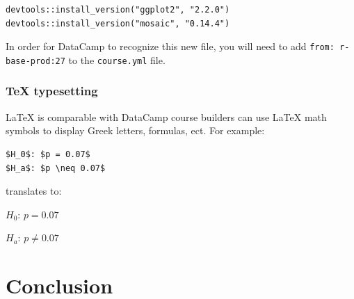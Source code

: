 \documentclass[12pt]{article}\usepackage[]{graphicx}\usepackage[]{color}
\begin{document}
\begin{verbatim}
devtools::install_version("ggplot2", "2.2.0")
devtools::install_version("mosaic", "0.14.4")
\end{verbatim}
In order for DataCamp to recognize this new file, you will need to add \texttt{from: r-base-prod:27} to the \texttt{course.yml} file.

\subsubsection{TeX typesetting}
LaTeX is comparable with DataCamp course builders can use LaTeX math symbols to display Greek letters, formulas, ect. For example:
\begin{verbatim}
$H_0$: $p = 0.07$
$H_a$: $p \neq 0.07$
\end{verbatim}

translates to:

$H_0$: $p = 0.07$

$H_a$: $p \neq 0.07$

\section{Conclusion}



\end{document}

